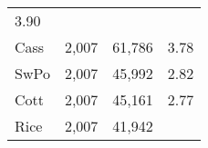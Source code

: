 \documentclass[]{article}
\begin{document}
\begin{longtable}[]{@{}lrrr@{}}
\begin{minipage}[t]{0.09\columnwidth}
3.90\strut
\end{minipage}\tabularnewline
\begin{minipage}[t]{0.16\columnwidth}\raggedright\strut
Cass\strut
\end{minipage} & \begin{minipage}[t]{0.09\columnwidth}\raggedleft\strut
2,007\strut
\end{minipage} & \begin{minipage}[t]{0.12\columnwidth}\raggedleft\strut
61,786\strut
\end{minipage} & \begin{minipage}[t]{0.09\columnwidth}\raggedleft\strut
3.78\strut
\end{minipage}\tabularnewline
\begin{minipage}[t]{0.16\columnwidth}\raggedright\strut
SwPo\strut
\end{minipage} & \begin{minipage}[t]{0.09\columnwidth}\raggedleft\strut
2,007\strut
\end{minipage} & \begin{minipage}[t]{0.12\columnwidth}\raggedleft\strut
45,992\strut
\end{minipage} & \begin{minipage}[t]{0.09\columnwidth}\raggedleft\strut
2.82\strut
\end{minipage}\tabularnewline
\begin{minipage}[t]{0.16\columnwidth}\raggedright\strut
Cott\strut
\end{minipage} & \begin{minipage}[t]{0.09\columnwidth}\raggedleft\strut
2,007\strut
\end{minipage} & \begin{minipage}[t]{0.12\columnwidth}\raggedleft\strut
45,161\strut
\end{minipage} & \begin{minipage}[t]{0.09\columnwidth}\raggedleft\strut
2.77\strut
\end{minipage}\tabularnewline
\begin{minipage}[t]{0.16\columnwidth}\raggedright\strut
Rice\strut
\end{minipage} & \begin{minipage}[t]{0.09\columnwidth}\raggedleft\strut
2,007\strut
\end{minipage} & \begin{minipage}[t]{0.12\columnwidth}\raggedleft\strut
41,942\strut
\end{minipage} & \begin{minipage}[t]{0.09\columnwidth}\raggedleft\strut

\end{minipage}
\end{longtable}
\end{document}
